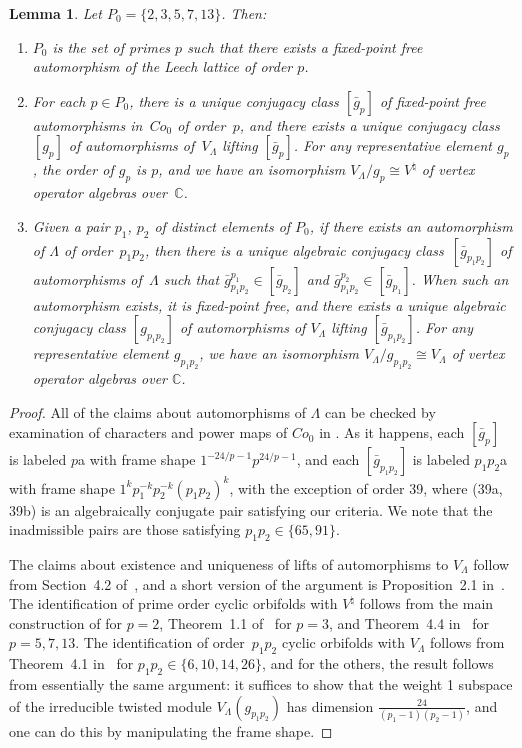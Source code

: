 \documentclass[11pt]{article}
\newcommand{\bC}{\mathbb{C}}
\newtheorem{lem}[thm]{Lemma}
\theoremstyle{definition}
\begin{document}
\begin{lem} \label{lem:cyclic-leech-orbifolds} Let $P_0 = \{ 2,3,5,7,13\}$. Then:
\begin{enumerate}\itemsep=0pt
\item[$1.$] $P_0$ is the set of primes $p$ such that there exists a fixed-point free automorphism of the Leech lattice of order $p$.
\item[$2.$] For each $p \in P_0$, there is a unique conjugacy class $[\bar{g}_p]$ of fixed-point free automorphisms in~$Co_0$ of order~$p$, and there exists a unique conjugacy class $[g_p]$ of automorphisms of~$V_\Lambda$ lifting $[\bar{g}_p]$. For any representative element $g_p$, the order of $g_p$ is $p$, and we have an isomorphism $V_\Lambda/g_p \cong V^\natural$ of vertex operator algebras over~$\bC$.
\item[$3.$] Given a pair $p_1$, $p_2$ of distinct elements of $P_0$, if there exists an automorphism of $\Lambda$ of order~$p_1p_2$, then there is a unique algebraic conjugacy class~$[\bar{g}_{p_1p_2}]$ of automorphisms of~$\Lambda$ such that $\bar{g}_{p_1p_2}^{p_1} \in [\bar{g}_{p_2}]$ and $\bar{g}_{p_1p_2}^{p_2} \in [\bar{g}_{p_1}]$. When such an automorphism exists, it is fixed-point free, and there exists a unique algebraic conjugacy class $[g_{p_1p_2}]$ of automorphisms of $V_\Lambda$ lifting $[\bar{g}_{p_1p_2}]$. For any representative element $g_{p_1p_2}$, we have an isomorphism $V_\Lambda/g_{p_1p_2} \cong V_\Lambda$ of vertex operator algebras over $\bC$.
\end{enumerate}
\end{lem}
\begin{proof}All of the claims about automorphisms of $\Lambda$ can be checked by examination of characters and power maps of $Co_0$ in \cite{GAP}. As it happens, each $[\bar{g}_p]$ is labeled $p$a with frame shape $1^{-24/p-1}p^{24/p-1}$, and each $[\bar{g}_{p_1p_2}]$ is labeled $p_1p_2$a with frame shape $1^kp_1^{-k}p_2^{-k}(p_1p_2)^k$, with the exception of order 39, where (39a, 39b) is an algebraically conjugate pair satisfying our criteria. We note that the inadmissible pairs are those satisfying $p_1p_2 \in \{ 65, 91\}$.

The claims about existence and uniqueness of lifts of automorphisms to $V_\Lambda$ follow from Section~4.2 of~\cite{LS17}, and a short version of the argument is Proposition~2.1 in~\cite{C17}. The identification of prime order cyclic orbifolds with $V^\natural$ follows from the main construction of \cite{FLM88} for $p=2$, Theorem~1.1 of~\cite{CLS16} for $p=3$, and Theorem~4.4 in~\cite{ALY17} for $p=5,7,13$. The identification of order~$p_1p_2$ cyclic orbifolds with $V_\Lambda$ follows from Theorem~4.1 in~\cite{ALY17} for $p_1p_2 \in \{6,10,14,26 \}$, and for the others, the result follows from essentially the same argument: it suffices to show that the weight 1 subspace of the irreducible twisted module $V_\Lambda(g_{p_1p_2})$ has dimension $\frac{24}{(p_1-1)(p_2-1)}$, and one can do this by manipulating the frame shape.
\end{proof}
\end{document}
